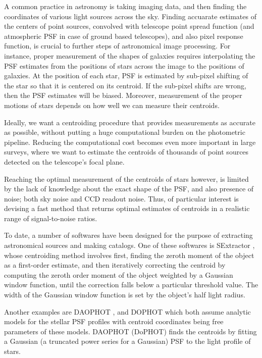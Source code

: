 \documentclass[12pt, preprint]{aastex}
\begin{document}
A common practice in astronomy is taking imaging data, and then finding the coordinates
of various light sources across the sky. Finding accuarate estimates of the centers of point
sources, convolved with telescope point spread function (and atmospheric PSF in case of
ground based telescopes), and also pixel response function, is crucial to further steps of
astronomical image processing. For instance, proper measurement of the shapes of galaxies
requires interpolating the PSF estimates from the positions of stars across the
image to the positions of galaxies. At the position of each star, PSF is estimated by sub-pixel 
shifting of the star so that it is centered on its centroid. If the sub-pixel shifts are wrong, then 
the PSF estimates will be biased. Moreover, measurement of the proper motions of stars
depends on how well we can measure their centroids. 

Ideally, we want a centroiding procedure that provides measurements as accurate as possible,
without putting a huge computational burden on the photometric pipeline.
Reducing the computational cost becomes even more important in large surveys,
where we want to estimate the centroids of thousands of point sources detected
on the telescope's focal plane. 

Reaching the optimal measurement of the centroids of stars however, is limited
by the lack of knowledge about the exact shape of the PSF, and also presence of noise;
both sky noise and CCD readout noise. Thus, of particular interest is devising a fast method that returns
optimal estimates of centroids in a realistic range of signal-to-noise ratios.

To date, a number of softwares have been designed for the purpose of extracting astronomical
sources and making catalogs. One of these softwares is SExtractor \citep{sex},
whose centroiding method involves first, finding the zeroth moment of the object
as a first-order estimate, and then iteratively correcting the centroid by computing
the zeroth order moment of the object weighted by a Gaussian window function,
until the correction falls below a particular threshold value.
The width of the Gaussian window function is set by the object's half light radius.

Another examples are DAOPHOT \citep{daophot}, and DOPHOT \citep{dophot}
which both assume analytic models for the stellar PSF profiles with centroid
coordinates being free parameters of these models.
DAOPHOT (DoPHOT) finds the centroids by fitting a Gaussian (a truncated power series for a Gaussian) PSF to
the light profile of stars.
\end{document}
